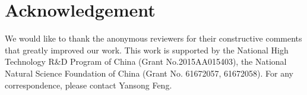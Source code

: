 \section*{Acknowledgement}
We would like to thank the anonymous reviewers for their constructive comments that greatly improved our work.
This work is supported by the National High Technology R\&D Program of China (Grant No.2015AA015403), the National Natural Science
Foundation of China (Grant No. 61672057, 61672058).
For any correspondence, please contact Yansong Feng.